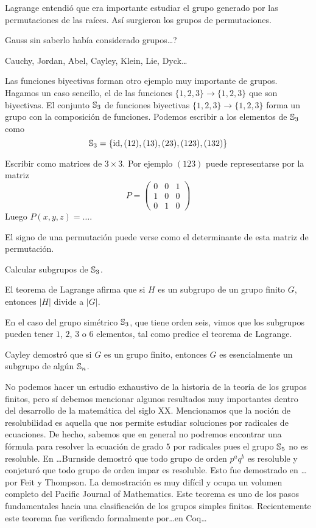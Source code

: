Lagrange entendió que era importante estudiar el grupo generado por las
permutaciones de las raíces. Así surgieron los grupos de permutaciones.

Gauss sin saberlo había considerado grupos\dots?

Cauchy, Jordan, Abel, Cayley, Klein, Lie, Dyck\dots

Las funciones biyectivas forman otro ejemplo muy importante de grupos. Hagamos un caso sencillo, el de las funciones 
$\{1,2,3\}\to\{1,2,3\}$ que son biyectivas. El conjunto $\mathbb{S}_3$ de funciones
biyectivas $\{1,2,3\}\to\{1,2,3\}$ forma un grupo con la composición de funciones. Podemos escribir
a los elementos de $\mathbb{S}_3$ como
\[
	\mathbb{S}_3=\{\operatorname{id},(12),(13),(23),(123),(132)\}
\]

Escribir como matrices de $3\times 3$. 
Por ejemplo
$(123)$ puede representarse por la matriz
\[
	P=\begin{pmatrix}
		0 & 0 & 1\\
		1 & 0 & 0\\
		0 & 1 & 0
	\end{pmatrix}
\]
Luego $P(x,y,z)=\dots$. 

El signo de una permutación puede verse como el determinante de esta matriz de permutación. 

Calcular subgrupos de $\mathbb{S}_3$.

El teorema de Lagrange afirma que si $H$ es un subgrupo de un grupo finito $G$,
entonces $|H|$ divide a $|G|$. 

\begin{example}
	En el caso del grupo simétrico $\mathbb{S}_3$, que tiene orden seis, vimos que los subgrupos
	pueden tener $1$, $2$, $3$ o $6$ elementos, tal como predice el teorema de Lagrange.
\end{example}

Cayley demostró que si $G$ es un grupo finito, entonces
$G$ es esencialmente un subgrupo de algún $\mathbb{S}_n$. 


No podemos hacer un estudio exhaustivo de la historia de la teoría de los
grupos finitos, pero sí debemos mencionar algunos resultados muy importantes
dentro del desarrollo de la matemática del siglo XX.  Mencionamos que la noción
de resolubilidad es aquella que nos permite estudiar soluciones por radicales
de ecuaciones. De hecho, sabemos que en general no podremos encontrar una
fórmula para resolver la ecuación de grado $5$ por radicales pues el grupo
$\mathbb{S}_5$ no es resoluble.  En \dots Burnside demostró que todo grupo de orden
$p^a q^b$ es resoluble y conjeturó que todo grupo de orden impar es resoluble.
Esto fue demostrado en \dots por Feit y Thompson. La demostración es muy
difícil y ocupa un volumen completo del Pacific Journal of Mathematics.  Este
teorema es uno de los pasos fundamentales hacia una clasificación de los grupos
simples finitos.  Recientemente este teorema fue verificado formalmente
por\dots en Coq\dots

